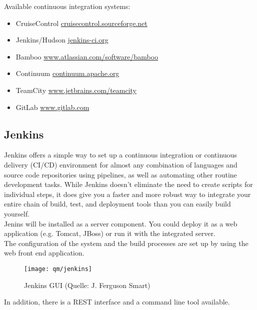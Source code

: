Available continuous integration systems:
\begin{itemize}
\item CruiseControl \href{http://cruisecontrol.sourceforge.net}
                        {cruisecontrol.sourceforge.net}
\item Jenkins/Hudson \href{http://jenkins-ci.org}{jenkins-ci.org}
\item Bamboo  \href{http://www.atlassian.com/software/bamboo}
     {www.atlassian.com/software/bamboo}
\item Continuum \href{http://continuum.apache.org}{continuum.apache.org}
\item TeamCity  \href{http://www.jetbrains.com/teamcity}
      {www.jetbrains.com/teamcity}
\item GitLab \href{http://www.gitlab.com}
      {www.gitlab.com}
\end{itemize}
%

\subsection{Jenkins}
Jenkins offers a simple way to set up a continuous integration or
continuous delivery (CI/CD) environment for almost any combination
of languages and source code repositories using pipelines,
as well as automating other routine development tasks.
While Jenkins doesn’t eliminate the need to create scripts for
individual steps, it does give you a faster and more robust way to
integrate your entire chain of build, test, and deployment tools
than you can easily build yourself.\\
Jenins will be installed as a server component. You could deploy it as
a web application (e.g. Tomcat, JBoss) or run it with the integrated
server.\\
The configuration of the system and the build processes are set up by
using the web front end application.

\begin{figure}[H]
  \centering
  \texttt{[image: qm/jenkins]}
  \caption{Jenkins GUI (Quelle: J. Ferguson Smart)}
  \label{fig:jenkins}
\end{figure}

In addition, there is a REST interface and a command line tool
available.

\vspace{3mm}

